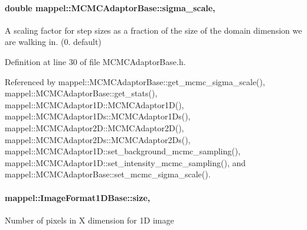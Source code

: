 \paragraph[{\texorpdfstring{sigma\+\_\+scale}{sigma_scale}}]{\setlength{\rightskip}{0pt plus 5cm}double mappel\+::\+M\+C\+M\+C\+Adaptor\+Base\+::sigma\+\_\+scale\hspace{0.3cm}{\ttfamily [protected]}, {\ttfamily [inherited]}}\hypertarget{classmappel_1_1MCMCAdaptorBase_a76312f7d589bf3f3e754beca174b884b}{}\label{classmappel_1_1MCMCAdaptorBase_a76312f7d589bf3f3e754beca174b884b}
A scaling factor for step sizes as a fraction of the size of the domain dimension we are walking in. (0. default) 

Definition at line 30 of file M\+C\+M\+C\+Adaptor\+Base.\+h.



Referenced by mappel\+::\+M\+C\+M\+C\+Adaptor\+Base\+::get\+\_\+mcmc\+\_\+sigma\+\_\+scale(), mappel\+::\+M\+C\+M\+C\+Adaptor\+Base\+::get\+\_\+stats(), mappel\+::\+M\+C\+M\+C\+Adaptor1\+D\+::\+M\+C\+M\+C\+Adaptor1\+D(), mappel\+::\+M\+C\+M\+C\+Adaptor1\+Ds\+::\+M\+C\+M\+C\+Adaptor1\+Ds(), mappel\+::\+M\+C\+M\+C\+Adaptor2\+D\+::\+M\+C\+M\+C\+Adaptor2\+D(), mappel\+::\+M\+C\+M\+C\+Adaptor2\+Ds\+::\+M\+C\+M\+C\+Adaptor2\+Ds(), mappel\+::\+M\+C\+M\+C\+Adaptor1\+D\+::set\+\_\+background\+\_\+mcmc\+\_\+sampling(), mappel\+::\+M\+C\+M\+C\+Adaptor1\+D\+::set\+\_\+intensity\+\_\+mcmc\+\_\+sampling(), and mappel\+::\+M\+C\+M\+C\+Adaptor\+Base\+::set\+\_\+mcmc\+\_\+sigma\+\_\+scale().

\paragraph[{\texorpdfstring{size}{size}}]{ mappel\+::\+Image\+Format1\+D\+Base\+::size\hspace{0.3cm}{\ttfamily [protected]}, {\ttfamily [inherited]}}\hypertarget{classmappel_1_1ImageFormat1DBase_a8941b4d028e4dd881146a7c1b9039bb1}{}\label{classmappel_1_1ImageFormat1DBase_a8941b4d028e4dd881146a7c1b9039bb1}
Number of pixels in X dimension for 1D image 


